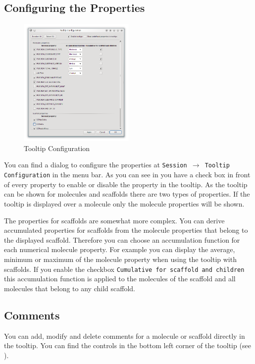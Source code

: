 \subsection{Configuring the Properties}

\begin{figure}[!htb]
   \centering
   \includegraphics[width=0.5\textwidth]{images/sh_tooltip_configuration_dialog.png}
   \caption{Tooltip Configuration}
   \label{fig:tooltip_configuration}
\end{figure}

You can find a dialog to configure the properties at \texttt{Session $\rightarrow$ Tooltip Configuration} in the menu bar. As you can see in  you have a check box in front of every property to enable or disable the property in the tooltip. As the tooltip can be shown for molecules and scaffolds there are two types of properties. If the tooltip is displayed over a molecule only the molecule properties will be shown. 

The properties for scaffolds are somewhat more complex. You can derive accumulated properties for scaffolds from the molecule properties that belong to the displayed scaffold. Therefore you can choose an accumulation function for each numerical molecule property. For example you can display the average, minimum or maximum of the molecule property when using the tooltip with scaffolds. 
If you enable the checkbox \texttt{Cumulative for scaffold and children} this accumulation function is applied to the molecules of the scaffold and all molecules that belong to any child scaffold.

\subsection{Comments}
You can add, modify and delete comments for a molecule or scaffold directly in the tooltip. You can find the controls in the bottom left corner of the tooltip (see ). 

